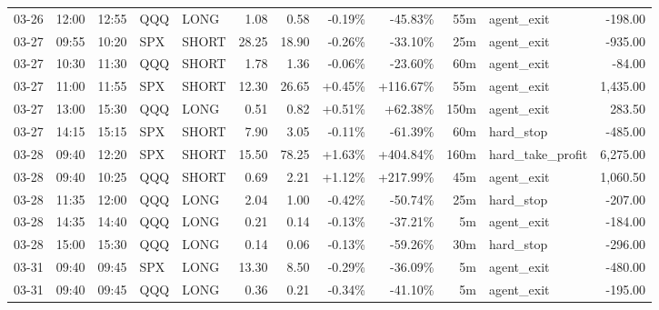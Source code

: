 \documentclass[11pt,a4paper,twoside]{article}
\begin{document}
\begin{center}
\begin{longtable}{>{\color{txtmain}}l l l l l r r r r r >{\color{txtmain}}l r}
03-26 & 12:00 & 12:55 & QQQ & LONG & 1.08 & 0.58 & \textcolor{lossred}{-0.19\%} & \textcolor{lossred}{-45.83\%} & 55m & agent\_exit & \textcolor{lossred}{-198.00} \\
03-27 & 09:55 & 10:20 & SPX & SHORT & 28.25 & 18.90 & \textcolor{lossred}{-0.26\%} & \textcolor{lossred}{-33.10\%} & 25m & agent\_exit & \textcolor{lossred}{-935.00} \\
03-27 & 10:30 & 11:30 & QQQ & SHORT & 1.78 & 1.36 & \textcolor{lossred}{-0.06\%} & \textcolor{lossred}{-23.60\%} & 60m & agent\_exit & \textcolor{lossred}{-84.00} \\
03-27 & 11:00 & 11:55 & SPX & SHORT & 12.30 & 26.65 & \textcolor{wingreen}{+0.45\%} & \textcolor{wingreen}{+116.67\%} & 55m & agent\_exit & \textcolor{wingreen}{1,435.00} \\
03-27 & 13:00 & 15:30 & QQQ & LONG & 0.51 & 0.82 & \textcolor{wingreen}{+0.51\%} & \textcolor{wingreen}{+62.38\%} & 150m & agent\_exit & \textcolor{wingreen}{283.50} \\
03-27 & 14:15 & 15:15 & SPX & SHORT & 7.90 & 3.05 & \textcolor{lossred}{-0.11\%} & \textcolor{lossred}{-61.39\%} & 60m & hard\_stop & \textcolor{lossred}{-485.00} \\
03-28 & 09:40 & 12:20 & SPX & SHORT & 15.50 & 78.25 & \textcolor{wingreen}{+1.63\%} & \textcolor{wingreen}{+404.84\%} & 160m & hard\_take\_profit & \textcolor{wingreen}{6,275.00} \\
03-28 & 09:40 & 10:25 & QQQ & SHORT & 0.69 & 2.21 & \textcolor{wingreen}{+1.12\%} & \textcolor{wingreen}{+217.99\%} & 45m & agent\_exit & \textcolor{wingreen}{1,060.50} \\
03-28 & 11:35 & 12:00 & QQQ & LONG & 2.04 & 1.00 & \textcolor{lossred}{-0.42\%} & \textcolor{lossred}{-50.74\%} & 25m & hard\_stop & \textcolor{lossred}{-207.00} \\
03-28 & 14:35 & 14:40 & QQQ & LONG & 0.21 & 0.14 & \textcolor{lossred}{-0.13\%} & \textcolor{lossred}{-37.21\%} & 5m & agent\_exit & \textcolor{lossred}{-184.00} \\
03-28 & 15:00 & 15:30 & QQQ & LONG & 0.14 & 0.06 & \textcolor{lossred}{-0.13\%} & \textcolor{lossred}{-59.26\%} & 30m & hard\_stop & \textcolor{lossred}{-296.00} \\
03-31 & 09:40 & 09:45 & SPX & LONG & 13.30 & 8.50 & \textcolor{lossred}{-0.29\%} & \textcolor{lossred}{-36.09\%} & 5m & agent\_exit & \textcolor{lossred}{-480.00} \\
03-31 & 09:40 & 09:45 & QQQ & LONG & 0.36 & 0.21 & \textcolor{lossred}{-0.34\%} & \textcolor{lossred}{-41.10\%} & 5m & agent\_exit & \textcolor{lossred}{-195.00} \\

\end{longtable}
\end{center}
\end{document}

